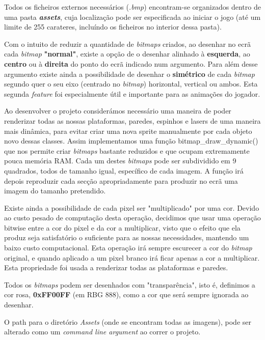 \documentclass{report}
\begin{document}
Todos os ficheiros externos necessários (\textit{.bmp}) encontram-se organizados dentro de uma pasta \textbf{\textit{assets}}, cuja localização pode ser especificada ao iniciar o jogo (até um limite de 255 carateres, incluíndo os ficheiros no interior dessa pasta).

Com o intuito de reduzir a quantidade de \textit{bitmaps} criados, ao desenhar no ecrã cada \textit{bitmap} \textbf{"normal"}, existe a opção de o desenhar alinhado à \textbf{esquerda}, ao \textbf{centro} ou à \textbf{direita} do ponto do ecrã indicado num argumento. Para além desse argumento existe ainda a possibilidade de desenhar o \textbf{simétrico} de cada \textit{bitmap} segundo quer o seu eixo (centrado no \textit{bitmap}) horizontal, vertical ou ambos. Esta segunda \textit{feature} foi especialmente útil e importante para as animações do jogador. 

Ao desenvolver o projeto considerámos necessário uma maneira de poder renderizar todas as nossas plataformas, paredes, espinhos e lasers de uma maneira mais dinâmica, para evitar criar uma nova sprite manualmente por cada objeto novo dessas classes. Assim implementamos uma função bitmap\_draw\_dynamic() que nos permite criar \textit{bitmaps} bastante reduzidos e que ocupam extremamente pouca memória RAM. Cada um destes \textit{bitmaps} pode ser subdividido em 9 quadrados, todos de tamanho igual, específico de cada imagem. A função irá depois reproduzir cada secção apropriadamente para produzir no ecrã uma imagem do tamanho pretendido.

Existe ainda a possibilidade de cada pixel ser "multiplicado" por uma cor. Devido ao custo pesado de computação desta operação, decidimos que usar uma operação bitwise entre a cor do pixel e da cor a multiplicar, visto que o efeito que ela produz seja satisfatório o suficiente para as nossas necessidades, mantendo um baixo custo computacional. Esta operação irá sempre escurecer a cor do \textit{bitmap} original, e quando aplicado a um pixel branco irá ficar apenas a cor a multiplicar. Esta propriedade foi usada a renderizar todas as plataformas e paredes. 

Todos os \textit{bitmaps} podem ser desenhados com "transparência", isto é, definimos a cor rosa, \textbf{0xFF00FF} (em RBG 888), como a cor que será sempre ignorada ao desenhar.

O path para o diretório \textit{Assets} (onde se encontram todas as imagens), pode ser alterado como um \textit{command line argument} ao correr o projeto.
\end{document}
